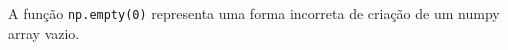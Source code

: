 \documentclass[12pt,varwidth=16cm,border=1pt]{standalone}
\begin{document}
A função \verb+np.empty(0)+ representa uma forma incorreta de criação de um numpy array vazio.

\questiomfalse
\end{document}
